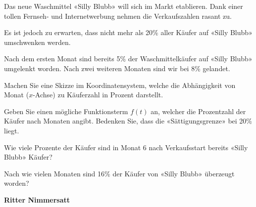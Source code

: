 Das neue Waschmittel «Silly Blubb» will sich im Markt etablieren.
Dank einer tollen Fernseh- und Internetwerbung nehmen die
Verkaufszahlen rasant zu.

Es ist jedoch zu erwarten, dass nicht mehr als 20\% aller Käufer auf
«Silly Blubb» umschwenken werden.

Nach dem ersten Monat sind bereits 5\% der Waschmittelkäufer auf
«Silly Blubb» umgelenkt worden. Nach zwei weiteren Monaten sind wir
bei 8\% gelandet.


\begin{bbwAufgabenBlock}
\item Machen Sie eine Skizze im Koordinatensystem, welche die
Abhängigkeit von Monat ($x$-Achse) zu Käuferzahl in Prozent darstellt.


\item Geben Sie einen mögliche Funktionsterm $f(t)$ an, welcher die
Prozentzahl der Käufer nach Monaten angibt. Bedenken Sie, dass die
«Sättigungsgrenze» bei 20\% liegt.


\item Wie viele Prozente der Käufer sind in Monat 6 nach Verkaufsstart
  bereits «Silly Blubb» Käufer?
  

\item Nach wie vielen Monaten sind 16\% der Käufer von «Silly Blubb»
  überzeugt worden?


\end{bbwAufgabenBlock}


\platzFuerBerechnungenBisEndeSeite{}



\bbwActAufgabenNr{} \textbf{Ritter Nimmersatt}

\nextBbwAufgabenNummer{}


